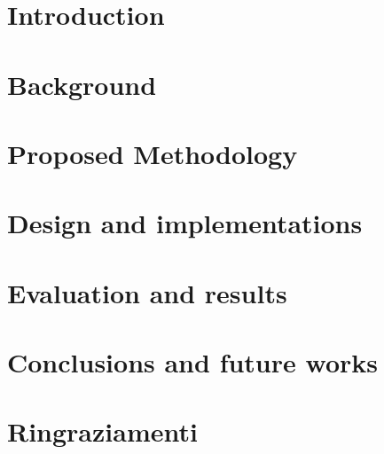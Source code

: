 \documentclass[
12pt, %
oneside, %
english, %
onehalfspacing,
liststotoc, %
headsepline, %
]{MastersDoctoralThesis} %
\begin{document}
\mainmatter %

\pagestyle{thesis} %

%

\chapter{Introduction}
\label{cap:introduzione}


\chapter{Background}
\label{cap:stato_dellarte}


\chapter{Proposed Methodology}
\label{cap:metodologia}


\chapter{Design and implementations}
\label{cap:progettazione}


\chapter{Evaluation and results}
\label{cap:sperimentazione}


\chapter{Conclusions and future works}
\label{cap:conclusioni}


\chapter*{Ringraziamenti}
\thispagestyle{empty}
\end{document}
